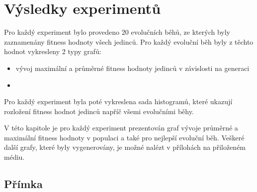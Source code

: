 

\chapter{Výsledky experimentů}
Pro každý experiment bylo provedeno 20 evolučních běhů, ze kterých byly zaznamenány fitness hodnoty všech jedinců.
Pro každý evoluční běh byly z těchto hodnot vykresleny 2 typy grafů:

\begin{itemize}
    \item vývoj maximální a průměrné fitness hodnoty jedinců v závislosti na generaci
    \item {}
\end{itemize}

Pro každý experiment byla poté vykreslena sada histogramů, které ukazují rozložení fitness hodnot jedinců napříč všemi evolučními běhy.

V této kapitole je pro každý experiment prezentován graf vývoje průměrné a maximální fitness hodnoty v populaci a také  pro nejlepší evoluční běh.
Veškeré další grafy, které byly vygenerovány, je možné nalézt v přílohách na přiloženém médiu.

\section{Přímka}

